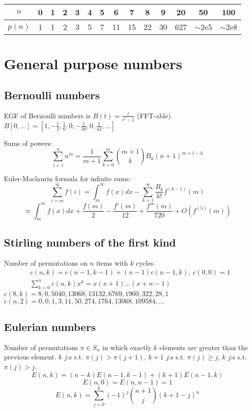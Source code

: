 \begin{center}
    \begin{tabular}{c|c@{\ }c@{\ }c@{\ }c@{\ }c@{\ }c@{\ }c@{\ }c@{\ }c@{\ }c@{\ }c@{\ }c@{\ }c}
        $n$    & 0 & 1 & 2 & 3 & 4 & 5 & 6  & 7  & 8  & 9  & 20  & 50                 & 100                \\ \hline
        $p(n)$ & 1 & 1 & 2 & 3 & 5 & 7 & 11 & 15 & 22 & 30 & 627 & $\mathtt{\sim}$2e5 & $\mathtt{\sim}$2e8 \\
    \end{tabular}
\end{center}
\normalsize

\section{General purpose numbers}
\subsection{Bernoulli numbers}
EGF of Bernoulli numbers is $B(t)=\frac{t}{e^t-1}$ (FFT-able).
$B[0,\ldots] = [1, -\frac{1}{2}, \frac{1}{6}, 0, -\frac{1}{30}, 0, \frac{1}{42}, \ldots]$

Sums of powers:
\small
\[ \sum_{i=1}^n n^m = \frac{1}{m+1} \sum_{k=0}^m \binom{m+1}{k} B_k (n+1)^{m+1-k} \]
\normalsize

Euler-Maclaurin formula for infinite sums:
\small
\[ \sum_{i=m}^{\infty} f(i) = \int_m^\infty f(x) dx - \sum_{k=1}^\infty \frac{B_k}{k!}f^{(k-1)}(m) \]
\[ \approx \int_{m}^\infty f(x)dx + \frac{f(m)}{2} - \frac{f'(m)}{12} + \frac{f'''(m)}{720} + O(f^{(5)}(m)) \]
\normalsize

\subsection{Stirling numbers of the first kind}
Number of permutations on $n$ items with $k$ cycles.
\begin{align*}
     & c(n,k) = c(n-1,k-1) + (n-1) c(n-1,k),\ c(0,0) = 1        \\
     & \textstyle \sum_{k=0}^n c(n,k)x^k = x(x+1) \dots (x+n-1)
\end{align*}
$c(8,k) = 8, 0, 5040, 13068, 13132, 6769, 1960, 322, 28, 1$ \\
$c(n,2) = 0, 0, 1, 3, 11, 50, 274, 1764, 13068, 109584, \dots$

\subsection{Eulerian numbers}
Number of permutations $\pi \in S_n$ in which exactly $k$ elements are greater than the previous element. $k$ $j$:s s.t. $\pi(j)>\pi(j+1)$, $k+1$ $j$:s s.t. $\pi(j)\geq j$, $k$ $j$:s s.t. $\pi(j)>j$.
$$E(n,k) = (n-k)E(n-1,k-1) + (k+1)E(n-1,k)$$
$$E(n,0) = E(n,n-1) = 1$$
$$E(n,k) = \sum_{j=0}^k(-1)^j\binom{n+1}{j}(k+1-j)^n$$

